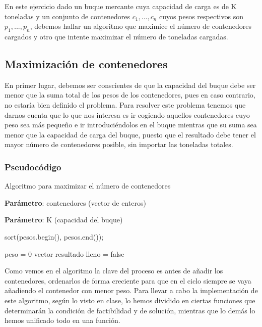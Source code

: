 En este ejercicio dado un buque mercante cuya capacidad de carga es de K toneladas y un conjunto de contenedores $c_1,...,c_n$ cuyos
pesos respectivos son $p_1,...,p_n$, debemos hallar un algoritmo que maximice el número de contenedores cargados y otro que intente 
maximizar el número de toneladas cargadas.

\subsection{Maximización de contenedores}

En primer lugar, debemos ser conscientes de que la capacidad del buque debe ser menor que la suma total de los pesos 
de los contenedores, pues en caso contrario, no estaría bien definido el problema. Para resolver este problema tenemos que darnos cuenta
que lo que nos interesa es ir cogiendo aquellos contenedores cuyo peso sea más pequeño e ir introduciéndolos en el buque mientras que su suma 
sea menor que la capacidad de carga del buque, puesto que el resultado debe tener el mayor número de contenedores posible, sin importar las 
toneladas totales. 

\subsubsection{Pseudocódigo}

\begin{algorithm}[H]
    \caption{Algoritmo para maximizar el número de contenedores}\label{alg:max_containers}
    \begin{minipage}{0.92\textwidth}
    \textbf{Parámetro}: contenedores (vector de enteros)

    \textbf{Parámetro}: K (capacidad del buque)

    \end{minipage}

    sort(pesos.begin(), pesos.end());

    peso = 0\;
    vector resultado\;
    lleno = false\;

     {
    }

    
\end{algorithm}

Como vemos en el algoritmo la clave del proceso es antes de añadir los contenedores, ordenarlos de forma creciente para que 
en el ciclo siempre se vaya añadiendo el contenedor con menor peso. 
Para llevar a cabo la implementación de este algoritmo, según lo visto en clase, lo hemos dividido en ciertas funciones que 
determinarán la condición de factibilidad y de solución, mientras que lo demás lo hemos unificado todo en una función. 

